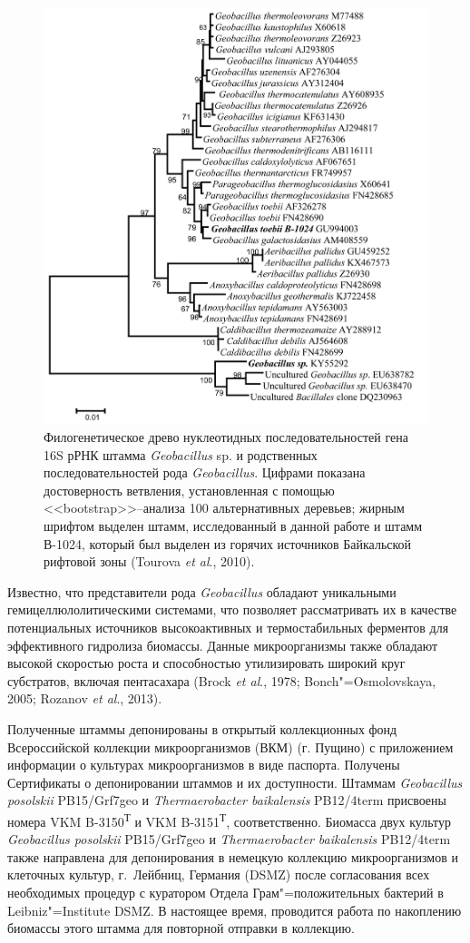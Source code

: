 \documentclass[a4paper,12pt,openany,final]{extreport}
\def\oldcaption{} \let\oldcaption=\caption
\def\caption{\stepcounter{captionsnum}\oldcaption}
\begin{document}
\begin{figure}\centering
\includegraphics[width=0.9\linewidth]{media/image13.png}

\caption{Филогенетическое древо нуклеотидных последовательностей гена 16S рРНК штамма \emph{Geobacillus} sp. и родственных последовательностей рода \emph{Geobacillus}. Цифрами показана достоверность ветвления, установленная с помощью <<bootstrap>>--анализа 100 альтернативных деревьев; жирным шрифтом выделен штамм, исследованный в данной работе и штамм В-1024, который был выделен из горячих источников Байкальской рифтовой зоны (Tourova \textit{et al}., 2010).}\label{fig:5-2}
\end{figure}

Известно, что представители рода \emph{Geobacillus} обладают уникальными гемицеллюлолитическими системами, что позволяет рассматривать их в качестве потенциальных источников высокоактивных и термостабильных ферментов для эффективного гидролиза биомассы. Данные микроорганизмы также обладают высокой скоростью роста и способностью утилизировать широкий круг субстратов, включая пентасахара (Brock \textit{et al}., 1978; Bonch"=Osmolovskaya, 2005; Rozanov \textit{et al}., 2013).

Полученные штаммы депонированы в открытый коллекционных фонд Всероссийской коллекции микроорганизмов (ВКМ) (г. Пущино) с приложением информации о культурах микроорганизмов в виде паспорта. Получены Сертификаты о депонировании штаммов и их доступности. Штаммам \emph{Geobacillus posolskii} PB15/Grf7geo и \emph{Thermaerobacter baikalensis} PB12/4term присвоены номера VKM B-3150\textsuperscript{Т} и VKM B-3151\textsuperscript{Т}, соответственно. Биомасса двух культур \emph{Geobacillus posolskii} PB15/Grf7geo и \emph{Thermaerobacter baikalensis} PB12/4term также направлена для депонирования в немецкую коллекцию микроорганизмов и клеточных культур, г.~Лейбниц, Германия (DSMZ) после согласования всех необходимых процедур с куратором Отдела Грам"=положительных бактерий в Leibniz"=Institute DSMZ. В настоящее время, проводится работа по накоплению биомассы этого штамма для повторной отправки в коллекцию.
\end{document}
